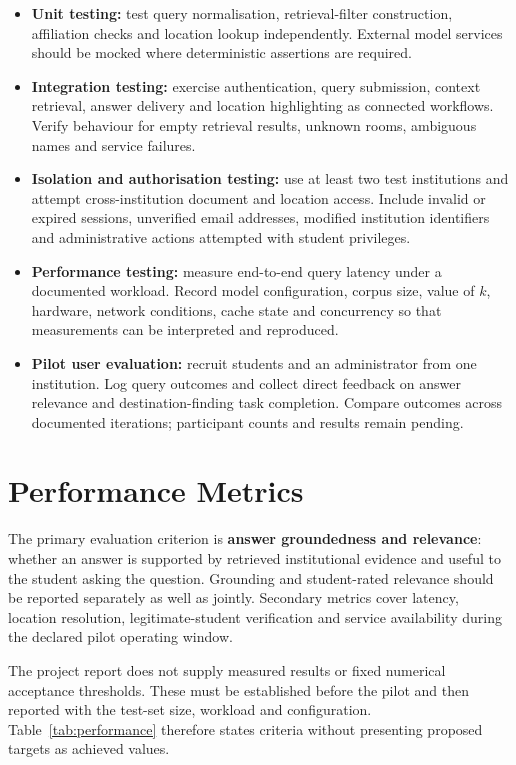 \documentclass{tietreport}
\begin{document}
\begin{itemize}
  \item \textbf{Unit testing:} test query normalisation, retrieval-filter
    construction, affiliation checks and location lookup independently.
    External model services should be mocked where deterministic assertions
    are required.
  \item \textbf{Integration testing:} exercise authentication, query submission,
    context retrieval, answer delivery and location highlighting as connected
    workflows. Verify behaviour for empty retrieval results, unknown rooms,
    ambiguous names and service failures.
  \item \textbf{Isolation and authorisation testing:} use at least two test
    institutions and attempt cross-institution document and location access.
    Include invalid or expired sessions, unverified email addresses, modified institution
    identifiers and administrative actions attempted with student privileges.
  \item \textbf{Performance testing:} measure end-to-end query latency under
    a documented workload. Record model configuration, corpus size, value of
    $k$, hardware, network conditions, cache state and concurrency so that
    measurements can be interpreted and reproduced.
  \item \textbf{Pilot user evaluation:} recruit students and an administrator
    from one institution. Log query outcomes and collect direct feedback on
    answer relevance and destination-finding task completion. Compare outcomes
    across documented iterations; participant counts and results remain pending.
\end{itemize}

\section{Performance Metrics}

The primary evaluation criterion is \textbf{answer groundedness and relevance}:
whether an answer is supported by retrieved institutional evidence and useful
to the student asking the question. Grounding and student-rated relevance
should be reported separately as well as jointly. Secondary metrics cover
latency, location resolution, legitimate-student verification and service
availability during the declared pilot operating window.

The project report does not supply measured results or fixed numerical
acceptance thresholds. These must be established before the pilot and then
reported with the test-set size, workload and configuration. Table~\ref{tab:performance}
therefore states criteria without presenting proposed targets as achieved values.
\end{document}
